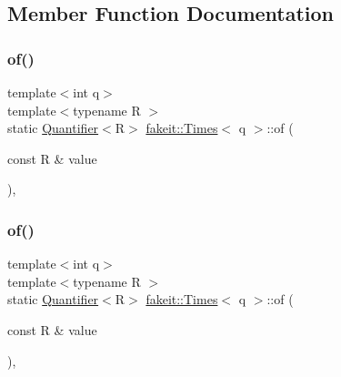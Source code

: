 \subsection{Member Function Documentation}
\mbox{\label{structfakeit_1_1Times_a9c53fb71e7c6d2e295a77909bd971193}} 
\subsubsection{\texorpdfstring{of()}{of()}\hspace{0.1cm}{\footnotesize\ttfamily [1/9]}}
{\footnotesize\ttfamily template$<$int q$>$ \\
template$<$typename R $>$ \\
static \mbox{\hyperlink{structfakeit_1_1Quantifier}{Quantifier}}$<$R$>$ \mbox{\hyperlink{structfakeit_1_1Times}{fakeit\+::\+Times}}$<$ q $>$\+::of (\begin{DoxyParamCaption}\item[{const R \&}]{value }\end{DoxyParamCaption})\hspace{0.3cm}{\ttfamily [inline]}, {\ttfamily [static]}}

\mbox{\label{structfakeit_1_1Times_a9c53fb71e7c6d2e295a77909bd971193}} 
\subsubsection{\texorpdfstring{of()}{of()}\hspace{0.1cm}{\footnotesize\ttfamily [2/9]}}
{\footnotesize\ttfamily template$<$int q$>$ \\
template$<$typename R $>$ \\
static \mbox{\hyperlink{structfakeit_1_1Quantifier}{Quantifier}}$<$R$>$ \mbox{\hyperlink{structfakeit_1_1Times}{fakeit\+::\+Times}}$<$ q $>$\+::of (\begin{DoxyParamCaption}\item[{const R \&}]{value }\end{DoxyParamCaption})\hspace{0.3cm}{\ttfamily [inline]}, {\ttfamily [static]}}

\mbox{\label{structfakeit_1_1Times_a9c53fb71e7c6d2e295a77909bd971193}} 
